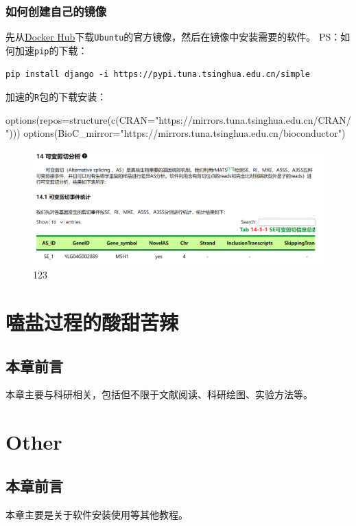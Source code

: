\documentclass[
]{book}
\newenvironment{Shaded}{\begin{snugshade}}{\end{snugshade}}
\newcommand{\AttributeTok}[1]{\textcolor[rgb]{0.77,0.63,0.00}{#1}}
\newcommand{\FunctionTok}[1]{\textcolor[rgb]{0.00,0.00,0.00}{#1}}
\newcommand{\NormalTok}[1]{#1}
\newcommand{\StringTok}[1]{\textcolor[rgb]{0.31,0.60,0.02}{#1}}
\begin{document}
\hypertarget{ux5982ux4f55ux521bux5efaux81eaux5df1ux7684ux955cux50cf}{%
\subsection{如何创建自己的镜像}\label{ux5982ux4f55ux521bux5efaux81eaux5df1ux7684ux955cux50cf}}

先从\href{https://hub.docker.com/}{Docker Hub}下载\texttt{Ubuntu}的官方镜像，然后在镜像中安装需要的软件。
PS：如何加速\texttt{pip}的下载：

\begin{verbatim}
pip install django -i https://pypi.tuna.tsinghua.edu.cn/simple
\end{verbatim}

加速的\texttt{R}包的下载安装：

\begin{Shaded}
\begin{Highlighting}[]
\FunctionTok{options}\NormalTok{(}\AttributeTok{repos=}\FunctionTok{structure}\NormalTok{(}\FunctionTok{c}\NormalTok{(}\AttributeTok{CRAN=}\StringTok{"https://mirrors.tuna.tsinghua.edu.cn/CRAN/"}\NormalTok{)))}
\FunctionTok{options}\NormalTok{(}\AttributeTok{BioC\_mirror=}\StringTok{"https://mirrors.tuna.tsinghua.edu.cn/bioconductor"}\NormalTok{)}
\end{Highlighting}
\end{Shaded}

\begin{figure}
\centering
\includegraphics{figures/0.png}
\caption{123}
\end{figure}

\hypertarget{research}{%
\chapter{嗑盐过程的酸甜苦辣}\label{research}}

\hypertarget{ux672cux7ae0ux524dux8a00-3}{%
\section{本章前言}\label{ux672cux7ae0ux524dux8a00-3}}

本章主要与科研相关，包括但不限于文献阅读、科研绘图、实验方法等。

\hypertarget{other}{%
\chapter{Other}\label{other}}

\hypertarget{ux672cux7ae0ux524dux8a00-4}{%
\section{本章前言}\label{ux672cux7ae0ux524dux8a00-4}}

本章主要是关于软件安装使用等其他教程。

\printbibliography
\end{document}
